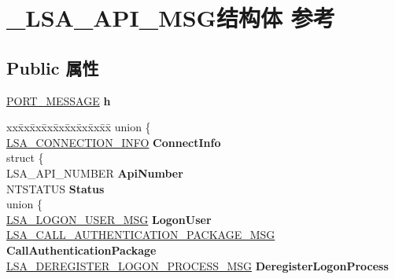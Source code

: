 \hypertarget{struct___l_s_a___a_p_i___m_s_g}{}\section{\+\_\+\+L\+S\+A\+\_\+\+A\+P\+I\+\_\+\+M\+S\+G结构体 参考}
\label{struct___l_s_a___a_p_i___m_s_g}
\subsection*{Public 属性}
\begin{DoxyCompactItemize}
\item 
\mbox{\label{struct___l_s_a___a_p_i___m_s_g_a670e587d2430b70ee78fc06528e2b806}} 
\hyperlink{struct___p_o_r_t___m_e_s_s_a_g_e___h_e_a_d_e_r}{P\+O\+R\+T\+\_\+\+M\+E\+S\+S\+A\+GE} {\bfseries h}
\item 
\mbox{\label{struct___l_s_a___a_p_i___m_s_g_a940af46a1e9d578567cdf0226e6d71d6}} 
\begin{tabbing}
xx\=xx\=xx\=xx\=xx\=xx\=xx\=xx\=xx\=\kill
union \{\\
\>\hyperlink{struct___l_s_a___c_o_n_n_e_c_t_i_o_n___i_n_f_o}{LSA\_CONNECTION\_INFO} {\bfseries ConnectInfo}\\
\mbox{\label{union___l_s_a___a_p_i___m_s_g_1_1_0D3021_a02e43a4a26ae2fde05302b7614a4de81}} 
\>struct \{\\
\>\>LSA\_API\_NUMBER {\bfseries ApiNumber}\\
\>\>NTSTATUS {\bfseries Status}\\
\mbox{\label{struct___l_s_a___a_p_i___m_s_g_1_1_0D3021_1_1_0D3023_a975e945e87b5060e3864a1009bd771d0}} 
\>\>union \{\\
\>\>\>\hyperlink{struct___l_s_a___l_o_g_o_n___u_s_e_r___m_s_g}{LSA\_LOGON\_USER\_MSG} {\bfseries LogonUser}\\
\>\>\>\hyperlink{struct___l_s_a___c_a_l_l___a_u_t_h_e_n_t_i_c_a_t_i_o_n___p_a_c_k_a_g_e___m_s_g}{LSA\_CALL\_AUTHENTICATION\_PACKAGE\_MSG} {\bfseries CallAuthenticationPackage}\\
\>\>\>\hyperlink{struct___l_s_a___d_e_r_e_g_i_s_t_e_r___l_o_g_o_n___p_r_o_c_e_s_s___m_s_g}{LSA\_DEREGISTER\_LOGON\_PROCESS\_MSG} {\bfseries DeregisterLogonProcess}\\

\end{tabbing}
\end{DoxyCompactItemize}

